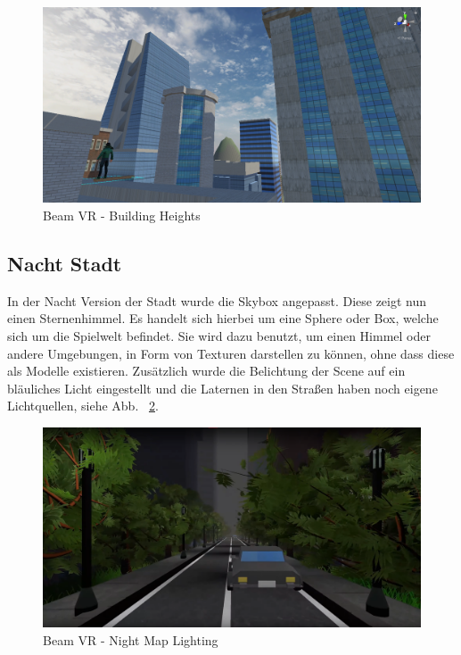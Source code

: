 \begin {figure}
    \centering
    \includegraphics[scale=0.5]{pics/beamvr_city_day_heights}
    \caption{Beam VR - Building Heights}
    \label{fig:beamvr_building-heights}
\end {figure}

\subsection{Nacht Stadt}\label{subsec:night-city}
In der Nacht Version der Stadt wurde die Skybox angepasst.
Diese zeigt nun einen Sternenhimmel.
Es handelt sich hierbei um eine Sphere oder Box, welche sich um die Spielwelt befindet.
Sie wird dazu benutzt, um einen Himmel oder andere Umgebungen,
in Form von Texturen darstellen zu können, ohne dass diese als Modelle existieren.
Zus\"atzlich wurde die Belichtung der Scene auf ein bl\"auliches Licht eingestellt und die Laternen in den Straßen
haben noch eigene Lichtquellen, siehe Abb. ~\ref{fig:beamvr_night_map_lighting}.

\begin {figure}
    \centering
    \includegraphics[scale=0.3]{pics/beamvr_night_overview}
    \caption{Beam VR - Night Map Lighting}
    \label{fig:beamvr_night_map_lighting}
\end {figure}

